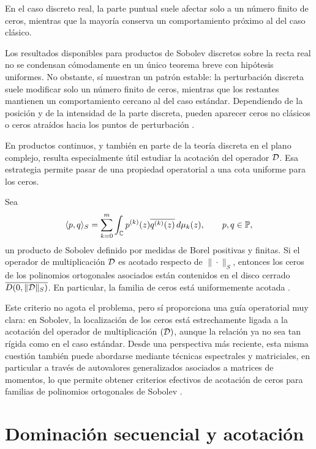 En el caso discreto real, la parte puntual suele afectar solo a un número finito
de ceros, mientras que la mayoría conserva un comportamiento próximo al del caso
clásico.

\begin{rmk}
	Los resultados disponibles para productos de Sobolev discretos sobre la recta
	real no se condensan cómodamente en un único teorema breve con hipótesis
	uniformes. No obstante, sí muestran un patrón estable: la perturbación discreta
	suele modificar solo un número finito de ceros, mientras que los restantes
	mantienen un comportamiento cercano al del caso estándar. Dependiendo de la
	posición y de la intensidad de la parte discreta, pueden aparecer ceros no
	clásicos o ceros atraídos hacia los puntos de perturbación
	\cite{AMRR92,ALR96,AlfRez01,Mei93,GK97}.
\end{rmk}

En productos continuos, y también en parte de la teoría discreta en el plano
complejo, resulta especialmente útil estudiar la acotación del operador
\(\mathcal{D}\). Esa estrategia permite pasar de una propiedad operatorial a una cota
uniforme para los ceros.

\begin{thm}
	\label{thm:intro_D_acotado_ceros_sobolev}
	Sea
	\[
		\langle p,q\rangle_S
		=
		\sum_{k=0}^m \int_{\mathbb{C}} p^{(k)}(z)\overline{q^{(k)}(z)}\,d\mu_k(z),
		\qquad p,q\in\mathbb{P},
	\]
	un producto de Sobolev definido por medidas de Borel positivas y finitas. Si el
	operador de multiplicación \(\mathcal{D}\) es acotado respecto de \(\|\cdot\|_S\),
	entonces los ceros de los polinomios ortogonales asociados están contenidos en el
	disco cerrado \(\overline{D(0,\|\mathcal{D}\|_S)}\).
	En particular, la familia de ceros está uniformemente acotada
	\cite{lopez1999zero,lopez2001sobolev}.
\end{thm}

Este criterio no agota el problema, pero sí proporciona una guía operatorial muy clara: en Sobolev, la localización de los ceros está estrechamente ligada a la acotación del operador de multiplicación $(\mathcal{D})$, aunque la relación ya no sea tan rígida como en el caso estándar. Desde una perspectiva más reciente, esta misma cuestión también puede abordarse mediante técnicas espectrales y matriciales, en particular a través de autovalores generalizados asociados a matrices de momentos, lo que permite obtener criterios efectivos de acotación de ceros para familias de polinomios ortogonales de Sobolev \cite{EG25}.


\section{Dominación secuencial y acotación}
\label{sec:dominacion_secuencial_intro}

